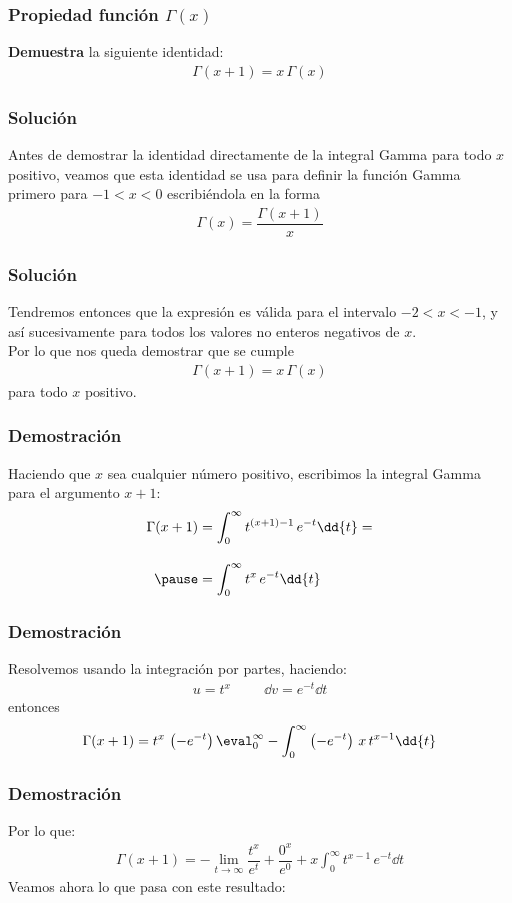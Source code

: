 \begin{frame}
\frametitle{Propiedad función $\Gamma(x)$}
\textbf{Demuestra} la siguiente identidad:
\begin{align*}
\Gamma (x + 1) = x \, \Gamma (x)
\end{align*}
\end{frame}
\begin{frame}
\frametitle{Solución}
Antes de demostrar la identidad directamente de la integral Gamma para todo $x$ positivo, veamos que esta identidad se usa para definir la función Gamma primero para $-1 < x < 0$ escribiéndola en la forma 
\begin{align*}
\Gamma(x) = \dfrac{\Gamma (x + 1)}{x}
\end{align*}
\end{frame}
\begin{frame}
\frametitle{Solución}
Tendremos entonces que la expresión es válida para el intervalo $-2 < x < -1$, y así sucesivamente para todos los valores no enteros negativos de $x$.
\\
\bigskip
\pause
Por lo que nos queda demostrar que se cumple
\begin{align*}
\Gamma (x + 1) =  x \, \Gamma (x)
\end{align*}
para todo $x$ positivo.
\end{frame}
\begin{frame}
\frametitle{Demostración}
Haciendo que $x$ sea cualquier número positivo, escribimos la integral Gamma para el argumento $x + 1$:
\begin{eqnarray*}
\Gamma (x + 1) &= \displaystyle \int_{0}^{\infty} t^{(x+1)-1} \, e^{-t} \dd{t} = \\[1em] \pause
&= \displaystyle \int_{0}^{\infty} t^{x} \, e^{-t} \dd{t}
\end{eqnarray*}
\end{frame}
\begin{frame}
\frametitle{Demostración}
Resolvemos usando la integración por partes, haciendo:
\begin{align*}
u = t^{x} \hspace{1cm} \dd{v} = e^{-t} \dd{t}
\end{align*}
entonces
\pause
\begin{align*}
\Gamma (x + 1) = t^{x} \, \left( - e^{-t}\right)\eval_{0}^{\infty} - \int_{0}^{\infty} \left( -e^{-t}\right) \, x \, t^{x-1} \dd{t}
\end{align*}
\end{frame}
\begin{frame}
\frametitle{Demostración}
Por lo que:
\begin{align*}
\Gamma (x + 1) = - \lim_{t \to \infty} \dfrac{t^{x}}{e^t} + \dfrac{0^{x}}{e^{0}} + x \int_{0}^{\infty} t^{x-1} \, e^{-t} \dd{t}
\end{align*}
\pause
Veamos ahora lo que pasa con este resultado:
\end{frame}
